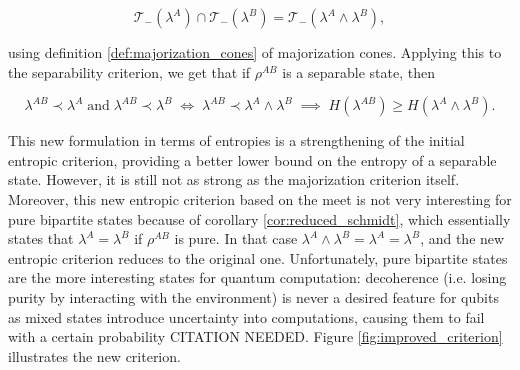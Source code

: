 \begin{equation}
    \mathcal{T}_-(\lambda^A) \cap \mathcal{T}_-(\lambda^B) = \mathcal{T}_-(\lambda^A \wedge \lambda^B),
\end{equation}

\noindent using definition \ref{def:majorization_cones} of majorization cones. Applying this to the separability criterion, we get that if $\rho^{AB}$ is a separable state, then

\begin{equation}
    \lambda^{AB} \prec \lambda^A \; \text{and} \; \lambda^{AB} \prec \lambda^{B} \; \iff \; \lambda^{AB} \prec \lambda^A \wedge \lambda^B \; \implies \; H(\lambda^{AB}) \geq H(\lambda^A \wedge \lambda^B).
\end{equation}

This new formulation in terms of entropies is a strengthening of the initial entropic criterion, providing a better lower bound on the entropy of a separable state. However, it is still not as strong as the majorization criterion itself. Moreover, this new entropic criterion based on the meet is not very interesting for pure bipartite states because of corollary \ref{cor:reduced_schmidt}, which essentially states that $\lambda^A = \lambda^B$ if $\rho^{AB}$ is pure. In that case $\lambda^A \wedge \lambda^B = \lambda^A = \lambda^B$, and the new entropic criterion reduces to the original one. Unfortunately, pure bipartite states are the more interesting states for quantum computation: decoherence (i.e. losing purity by interacting with the environment) is never a desired feature for qubits as mixed states introduce uncertainty into computations, causing them to fail with a certain probability CITATION NEEDED. Figure \ref{fig:improved_criterion} illustrates the new criterion.

